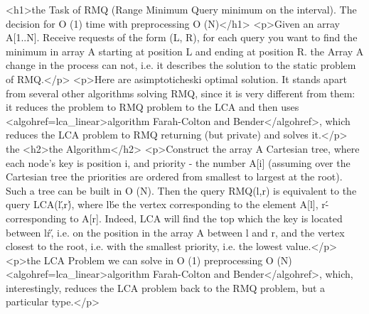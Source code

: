<h1>the Task of RMQ (Range Minimum Query minimum on the interval). The decision for O (1) time with preprocessing O (N)</h1>
<p>Given an array A[1..N]. Receive requests of the form (L, R), for each query you want to find the minimum in array A starting at position L and ending at position R. the Array A change in the process can not, i.e. it describes the solution to the static problem of RMQ.</p>
<p>Here are asimptoticheski optimal solution. It stands apart from several other algorithms solving RMQ, since it is very different from them: it reduces the problem to RMQ problem to the LCA and then uses <algohref=lca_linear>algorithm Farah-Colton and Bender</algohref>, which reduces the LCA problem to RMQ returning (but private) and solves it.</p>
the <h2>the Algorithm</h2>
<p>Construct the array A Cartesian tree, where each node's key is position i, and priority - the number A[i] (assuming over the Cartesian tree the priorities are ordered from smallest to largest at the root). Such a tree can be built in O (N). Then the query RMQ(l,r) is equivalent to the query LCA(l\',r\'), where l\' be the vertex corresponding to the element A[l], r\' - corresponding to A[r]. Indeed, LCA will find the top which the key is located between l\' r\', i.e. on the position in the array A between l and r, and the vertex closest to the root, i.e. with the smallest priority, i.e. the lowest value.</p>
<p>the LCA Problem we can solve in O (1) preprocessing O (N) <algohref=lca_linear>algorithm Farah-Colton and Bender</algohref>, which, interestingly, reduces the LCA problem back to the RMQ problem, but a particular type.</p>